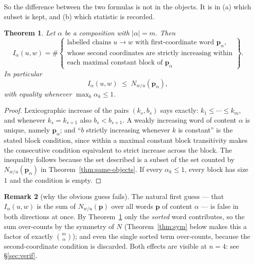 \documentclass[11pt]{article}
\theoremstyle{plain}
\newtheorem{theorem}{Theorem}[section]
\theoremstyle{definition}
\newtheorem{remark}[theorem]{Remark}
\newcommand{\pv}{\mathbf{p}}
\begin{document}
So the difference between the two formulas is not in the objects. It is in
(a) which subset is kept, and (b) which statistic is recorded.

\begin{theorem}\label{thm:statistic}
Let $\alpha$ be a composition with $|\alpha|=m$. Then
\[
  I_\alpha(u,w)=\#\left\{
  \begin{array}{l}
  \text{labelled chains }u\to w\text{ with first-coordinate word }\pv_\alpha,\\
  \text{whose second coordinates are strictly increasing within}\\
  \text{each maximal constant block of } \pv_\alpha
  \end{array}\right\}.
\]
In particular
\[
  I_\alpha(u,w)\;\le\;N_{w/u}(\pv_\alpha),
\]
with equality whenever $\max_k\alpha_k\le 1$.
\end{theorem}

\begin{proof}
Lexicographic increase of the pairs $(k_s,b_s)$ says exactly: $k_1\le\cdots\le
k_m$, and whenever $k_s=k_{s+1}$ also $b_s<b_{s+1}$. A weakly increasing word of
content $\alpha$ is unique, namely $\pv_\alpha$; and ``$b$ strictly increasing
whenever $k$ is constant'' is the stated block condition, since within a maximal
constant block transitivity makes the consecutive condition equivalent to
strict increase across the block. The inequality follows because the set
described is a subset of the set counted by $N_{w/u}(\pv_\alpha)$ in
Theorem~\ref{thm:same-objects}. If every $\alpha_k\le1$, every block has size
$1$ and the condition is empty.
\end{proof}

\begin{remark}[why the obvious guess fails]\label{rem:brief}
The natural first guess --- that $I_\alpha(u,w)$ is the sum of $N_{w/u}(\pv)$
over all words $\pv$ of content $\alpha$ --- is false in both directions at
once. By Theorem~\ref{thm:statistic} only the \emph{sorted} word contributes, so
the sum over-counts by the symmetry of $N$ (Theorem~\ref{thm:sym} below makes
this a factor of exactly $\binom{m}{\alpha}$); and even the single sorted term
over-counts, because the second-coordinate condition is discarded. Both effects
are visible at $n=4$: see \S\ref{sec:verif}.
\end{remark}
\end{document}
